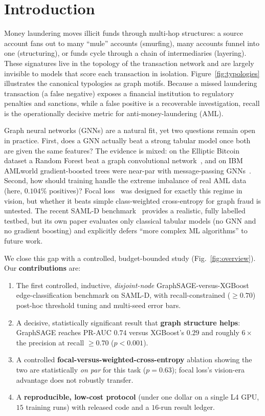 \documentclass[conference]{IEEEtran}
\begin{document}
\section{Introduction}
Money laundering moves illicit funds through multi-hop structures: a source account fans out to many
``mule'' accounts (smurfing), many accounts funnel into one (structuring), or funds cycle through a chain
of intermediaries (layering). These signatures live in the topology of the transaction network and are
largely invisible to models that score each transaction in isolation. Figure~\ref{fig:typologies}
illustrates the canonical typologies as graph motifs. Because a missed laundering transaction (a false
negative) exposes a financial institution to regulatory penalties and sanctions, while a false positive is
a recoverable investigation, recall is the operationally decisive metric for anti-money-laundering (AML).

Graph neural networks (GNNs) are a natural fit, yet two questions remain open in practice. First, does a
GNN actually beat a strong tabular model once both are given the same features? The evidence is mixed: on
the Elliptic Bitcoin dataset a Random Forest beat a graph convolutional network~\cite{weber2019aml}, and on
IBM AMLworld gradient-boosted trees were near-par with message-passing GNNs~\cite{altman2023amlworld}.
Second, how should training handle the extreme imbalance of real AML data (here, $0.104\%$ positives)?
Focal loss~\cite{lin2017focal} was designed for exactly this regime in vision, but whether it beats simple
class-weighted cross-entropy for graph fraud is untested. The recent SAML-D benchmark~\cite{oztas2023samld}
provides a realistic, fully labelled testbed, but its own paper evaluates only classical tabular models
(no GNN and no gradient boosting) and explicitly defers ``more complex ML algorithms'' to future work.

We close this gap with a controlled, budget-bounded study (Fig.~\ref{fig:overview}). Our
\textbf{contributions} are:
\begin{enumerate}
\item The first controlled, inductive, \emph{disjoint-node} GraphSAGE-versus-XGBoost edge-classification
benchmark on SAML-D, with recall-constrained ($\geq 0.70$) post-hoc threshold tuning and multi-seed error bars.
\item A decisive, statistically significant result that \textbf{graph structure helps}: GraphSAGE reaches
PR-AUC $0.74$ versus XGBoost's $0.29$ and roughly $6\times$ the precision at recall $\geq 0.70$
($p < 0.001$).
\item A controlled \textbf{focal-versus-weighted-cross-entropy} ablation showing the two are statistically
\emph{on par} for this task ($p = 0.63$); focal loss's vision-era advantage does not robustly transfer.
\item A \textbf{reproducible, low-cost protocol} (under one dollar on a single L4 GPU, $15$ training runs)
with released code and a $16$-run result ledger.
\end{enumerate}
\end{document}
